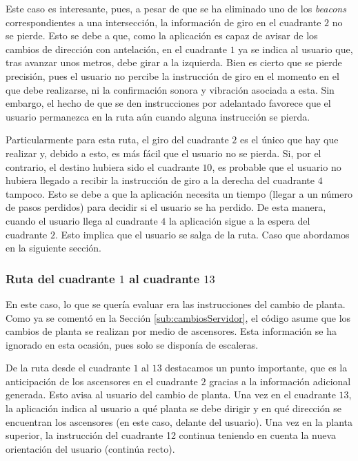 Este caso es interesante, pues, a pesar de que se ha eliminado uno de los \textit{beacons} correspondientes a una intersección, la información de giro en el cuadrante $2$ no se pierde. Esto se debe a que, como la aplicación es capaz de avisar de los cambios de dirección con antelación, en el cuadrante $1$ ya se indica al usuario que, tras avanzar unos metros, debe girar a la izquierda. Bien es cierto que se pierde precisión, pues el usuario no percibe la instrucción de giro en el momento en el que debe realizarse, ni la confirmación sonora y vibración asociada a esta. Sin embargo, el hecho de que se den instrucciones por adelantado favorece que el usuario permanezca en la ruta aún cuando alguna instrucción se pierda. 

Particularmente para esta ruta, el giro del cuadrante $2$ es el único que hay que realizar y, debido a esto, es más fácil que el usuario no se pierda. Si, por el contrario, el destino hubiera sido el cuadrante $10$, es probable que el usuario no hubiera llegado a recibir la instrucción de giro a la derecha del cuadrante $4$ tampoco. Esto se debe a que la aplicación necesita un tiempo (llegar a un número de pasos perdidos) para decidir si el usuario se ha perdido. De esta manera, cuando el usuario llega al cuadrante $4$ la aplicación sigue a la espera del cuadrante $2$. Esto implica que el usuario se salga de la ruta. Caso que abordamos en la siguiente sección.


\subsubsection{Ruta del cuadrante $1$ al cuadrante $13$}

En este caso, lo que se quería evaluar era las instrucciones del cambio de planta. Como ya se comentó en la Sección \ref{sub:cambiosServidor}, el código asume que los cambios de planta se realizan por medio de ascensores. Esta información se ha ignorado en esta ocasión, pues solo se disponía de escaleras. 

De la ruta desde el cuadrante $1$ al $13$ destacamos un punto importante, que es la anticipación de los ascensores en el cuadrante $2$ gracias a la información adicional generada. Esto avisa al usuario del cambio de planta. Una vez en el cuadrante $13$, la aplicación indica al usuario a qué planta se debe dirigir y en qué dirección se encuentran los ascensores (en este caso, delante del usuario). Una vez en la planta superior, la instrucción del cuadrante 12 continua teniendo en cuenta la nueva orientación del usuario (continúa recto). 

